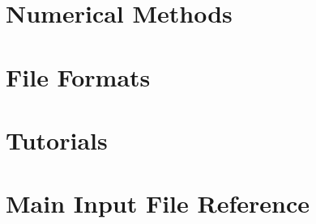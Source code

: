 \documentclass[12pt,a4paper]{report}
\begin{document}










\chapter{Numerical Methods}






%


\chapter{File Formats}
\label{chapter:file-formats}





% 
%   

%  
% 
%  

\chapter{Tutorials}\label{ch:tutorials}


\chapter{Main Input File Reference}
\label{chapter:input-tree-reference}






\end{document}
